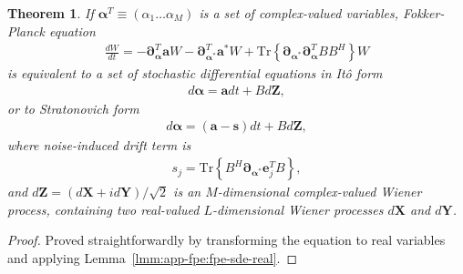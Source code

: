 \documentclass[12pt,aip,jmp,amssymb,amsmath]{revtex4-1}
\newtheorem{theorem}{Theorem}
\begin{document}
\begin{theorem}
\label{thm:app-fpe:fpe-sde-complex}
    If $\boldsymbol{\alpha}^T \equiv (\alpha_1 \ldots \alpha_M)$ is a set of complex-valued variables,
    Fokker-Planck equation
    \begin{equation*}\begin{split}
        \frac{dW}{dt}
        = -\boldsymbol{\partial}_{\boldsymbol{\alpha}}^T \boldsymbol{a} W - \boldsymbol{\partial}_{\boldsymbol{\alpha}^*}^T \boldsymbol{a}^* W
        + \mathrm{Tr} \left\{ \boldsymbol{\partial}_{\boldsymbol{\alpha}^*} \boldsymbol{\partial}_{\boldsymbol{\alpha}}^T B B^H \right\} W
    \end{split}\end{equation*}
    is equivalent to a set of stochastic differential equations in It\^{o} form
    \begin{equation*}\begin{split}
        d\boldsymbol{\alpha} = \boldsymbol{a} dt + B d\boldsymbol{Z},
    \end{split}\end{equation*}
    or to Stratonovich form
    \begin{equation*}\begin{split}
        d\boldsymbol{\alpha} = (\boldsymbol{a} - \boldsymbol{s}) dt + B d\boldsymbol{Z},
    \end{split}\end{equation*}
    where noise-induced drift term is
    \begin{equation*}\begin{split}
        s_j = \mathrm{Tr} \left\{ B^H \boldsymbol{\partial}_{\boldsymbol{\alpha}^*} \boldsymbol{e}_j^T B \right\},
    \end{split}\end{equation*}
    and $d\boldsymbol{Z} = (d\boldsymbol{X} + id\boldsymbol{Y}) / \sqrt{2}$ is an $M$-dimensional complex-valued Wiener process,
    containing two real-valued $L$-dimensional Wiener processes $d\boldsymbol{X}$ and $d\boldsymbol{Y}$.
\end{theorem}
\begin{proof}
Proved straightforwardly by transforming the equation to real variables and applying Lemma~\ref{lmm:app-fpe:fpe-sde-real}.
\end{proof}
\end{document}
